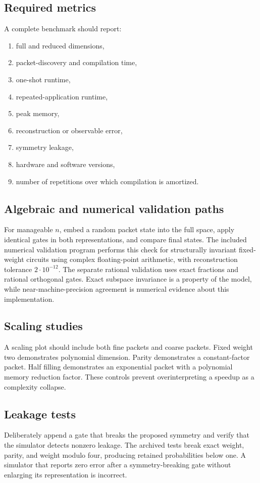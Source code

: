 \subsection{Required metrics}
A complete benchmark should report:

\begin{enumerate}
\item full and reduced dimensions,
\item packet-discovery and compilation time,
\item one-shot runtime,
\item repeated-application runtime,
\item peak memory,
\item reconstruction or observable error,
\item symmetry leakage,
\item hardware and software versions,
\item number of repetitions over which compilation is amortized.
\end{enumerate}

\subsection{Algebraic and numerical validation paths}
For manageable $n$, embed a random packet state into the full space, apply identical gates in both representations, and compare final states. The included numerical validation program performs this check for structurally invariant fixed-weight circuits using complex floating-point arithmetic, with reconstruction tolerance $2\cdot10^{-12}$. The separate rational validation uses exact fractions and rational orthogonal gates. Exact subspace invariance is a property of the model, while near-machine-precision agreement is numerical evidence about this implementation.

\subsection{Scaling studies}
A scaling plot should include both fine packets and coarse packets. Fixed weight two demonstrates polynomial dimension. Parity demonstrates a constant-factor packet. Half filling demonstrates an exponential packet with a polynomial memory reduction factor. These controls prevent overinterpreting a speedup as a complexity collapse.

\subsection{Leakage tests}
Deliberately append a gate that breaks the proposed symmetry and verify that the simulator detects nonzero leakage. The archived tests break exact weight, parity, and weight modulo four, producing retained probabilities below one. A simulator that reports zero error after a symmetry-breaking gate without enlarging its representation is incorrect.

